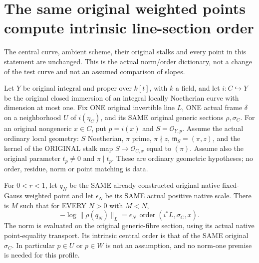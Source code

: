 \section{The same original weighted points compute intrinsic line-section order}

The central curve, ambient scheme, their original stalks and every point in
this statement are unchanged.  This is the actual norm/order dictionary,
not a change of the test curve and not an assumed comparison of slopes.

\begin{theorem}
\label{thm:intrinsic-numerical-gauss-original-line-order-profile}
\leanok
{}
Let $Y$ be original integral and proper over $k[t]$, with $k$ a field,
and let $i:C\hookrightarrow Y$ be the original closed immersion of an
integral locally Noetherian curve with dimension at most one.  Fix ONE
original invertible line $L$, ONE actual frame $\delta$ on a neighborhood
$U$ of $i(\eta_C)$, and its SAME original generic sections $\rho,\sigma_C$.
For an original nongeneric $x\in C$, put $p=i(x)$ and
$S=\mathcal O_{Y,p}$.  Assume the actual ordinary local geometry:
$S$ Noetherian, $\pi$ prime, $\pi\nmid z$,
$\mathfrak m_S=(\pi,z)$, and the kernel of the ORIGINAL stalk map
$S\to\mathcal O_{C,x}$ equal to $(\pi)$.  Assume also the original
parameter $t_p\ne0$ and $\pi\mid t_p$.  These are ordinary geometric
hypotheses; no order, residue, norm or point matching is data.

For $0<r<1$, let $q_N$ be the SAME already constructed original native
fixed-Gauss weighted point and let $\epsilon_N$ be its SAME actual positive
native scale.  There is $M$ such that for EVERY $N>0$ with $M<N$,
\[
 -\log\|\rho(q_N)\|_L
   =\epsilon_N\,\operatorname{order}(i^*L,\sigma_C,x).
\]
The norm is evaluated on the original generic-fibre section, using its
actual native point-equality transport.  Its intrinsic central order is
that of the SAME original $\sigma_C$.  In particular $p\in U$ or $p\in W$
is not an assumption, and no norm-one premise is needed for this profile.
\end{theorem}
